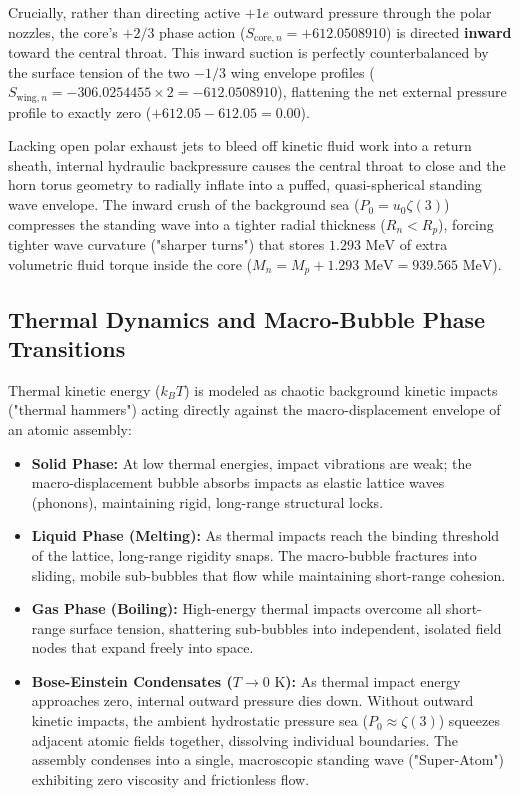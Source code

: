 \documentclass[11pt,a4paper]{article}
\begin{document}
	Crucially, rather than directing active $+1e$ outward pressure through the polar nozzles, the core's $+2/3$ phase action ($S_{\text{core}, n} = +612.0508910$) is directed \textbf{inward} toward the central throat. This inward suction is perfectly counterbalanced by the surface tension of the two $-1/3$ wing envelope profiles ($S_{\text{wing}, n} = -306.0254455 \times 2 = -612.0508910$), flattening the net external pressure profile to exactly zero ($+612.05 - 612.05 = 0.00$).
	
	Lacking open polar exhaust jets to bleed off kinetic fluid work into a return sheath, internal hydraulic backpressure causes the central throat to close and the horn torus geometry to radially inflate into a puffed, quasi-spherical standing wave envelope. The inward crush of the background sea ($P_0 = u_0 \zeta(3)$) compresses the standing wave into a tighter radial thickness ($R_n < R_p$), forcing tighter wave curvature ("sharper turns") that stores $1.293\text{ MeV}$ of extra volumetric fluid torque inside the core ($M_n = M_p + 1.293\text{ MeV} = 939.565\text{ MeV}$).
	
	\subsection{Thermal Dynamics and Macro-Bubble Phase Transitions}
	Thermal kinetic energy ($k_B T$) is modeled as chaotic background kinetic impacts ("thermal hammers") acting directly against the macro-displacement envelope of an atomic assembly:
	\begin{itemize}
		\item \textbf{Solid Phase:} At low thermal energies, impact vibrations are weak; the macro-displacement bubble absorbs impacts as elastic lattice waves (phonons), maintaining rigid, long-range structural locks.
		\item \textbf{Liquid Phase (Melting):} As thermal impacts reach the binding threshold of the lattice, long-range rigidity snaps. The macro-bubble fractures into sliding, mobile sub-bubbles that flow while maintaining short-range cohesion.
		\item \textbf{Gas Phase (Boiling):} High-energy thermal impacts overcome all short-range surface tension, shattering sub-bubbles into independent, isolated field nodes that expand freely into space.
		\item \textbf{Bose-Einstein Condensates ($T \to 0\text{ K}$):} As thermal impact energy approaches zero, internal outward pressure dies down. Without outward kinetic impacts, the ambient hydrostatic pressure sea ($P_0 \approx \zeta(3)$) squeezes adjacent atomic fields together, dissolving individual boundaries. The assembly condenses into a single, macroscopic standing wave ("Super-Atom") exhibiting zero viscosity and frictionless flow.
	\end{itemize}
	
\end{document}
